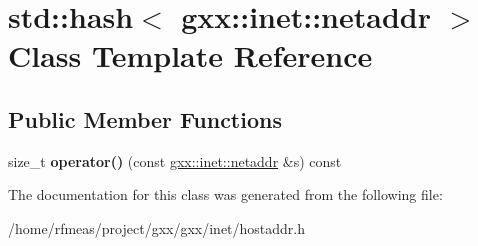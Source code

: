 \hypertarget{classstd_1_1hash_3_01gxx_1_1inet_1_1netaddr_01_4}{}\section{std\+:\+:hash$<$ gxx\+:\+:inet\+:\+:netaddr $>$ Class Template Reference}
\label{classstd_1_1hash_3_01gxx_1_1inet_1_1netaddr_01_4}
\subsection*{Public Member Functions}
\begin{DoxyCompactItemize}
\item 
size\+\_\+t {\bfseries operator()} (const \hyperlink{structgxx_1_1inet_1_1netaddr}{gxx\+::inet\+::netaddr} \&s) const \hypertarget{classstd_1_1hash_3_01gxx_1_1inet_1_1netaddr_01_4_ac69e7c1d7bacb0d5eadc9e41420996f0}{}\label{classstd_1_1hash_3_01gxx_1_1inet_1_1netaddr_01_4_ac69e7c1d7bacb0d5eadc9e41420996f0}

\end{DoxyCompactItemize}


The documentation for this class was generated from the following file\+:\begin{DoxyCompactItemize}
\item 
/home/rfmeas/project/gxx/gxx/inet/hostaddr.\+h\end{DoxyCompactItemize}
